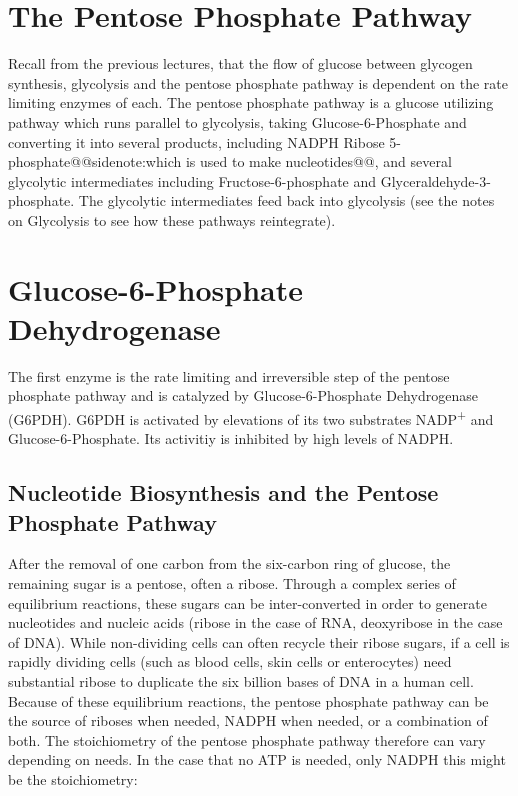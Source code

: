 \documentclass{tufte-handout}
\makeatletter
\def\sidenote#1{@@sidenote:#1@@}
\makeatother
\begin{document}
\section{The Pentose Phosphate Pathway}

Recall from the previous lectures, that the flow of glucose between glycogen synthesis, glycolysis and the pentose phosphate pathway is dependent on the rate limiting enzymes of each.  The pentose phosphate pathway is a glucose utilizing pathway which runs parallel to glycolysis, taking Glucose-6-Phosphate and converting it into several products, including NADPH Ribose 5-phosphate\sidenote{which is used to make nucleotides}, and several glycolytic intermediates including Fructose-6-phosphate and Glyceraldehyde-3-phosphate.  The glycolytic intermediates feed back into glycolysis (see the notes on Glycolysis to see how these pathways reintegrate).

\section{Glucose-6-Phosphate Dehydrogenase}

The first enzyme is the rate limiting and irreversible step of the pentose phosphate pathway and is catalyzed by Glucose-6-Phosphate Dehydrogenase (G6PDH).  G6PDH is activated by elevations of its two substrates NADP\textsuperscript{+} and Glucose-6-Phosphate.  Its activitiy is inhibited by high levels of NADPH.  

\subsection{Nucleotide Biosynthesis and the Pentose Phosphate Pathway}
After the removal of one carbon from the six-carbon ring of glucose, the remaining sugar is a pentose, often a ribose.  Through a complex series of equilibrium reactions, these sugars can be inter-converted in order to generate nucleotides and nucleic acids (ribose in the case of RNA, deoxyribose in the case of DNA).  While non-dividing cells can often recycle their ribose sugars, if a cell is rapidly dividing cells (such as blood cells, skin cells or enterocytes) need substantial ribose to duplicate the six billion bases of DNA in a human cell.  Because of these equilibrium reactions, the pentose phosphate pathway can be the source of riboses when needed, NADPH when needed, or a combination of both.  The stoichiometry of the pentose phosphate pathway therefore can vary depending on needs.  In the case that no ATP is needed, only NADPH this might be the stoichiometry:
\end{document}
